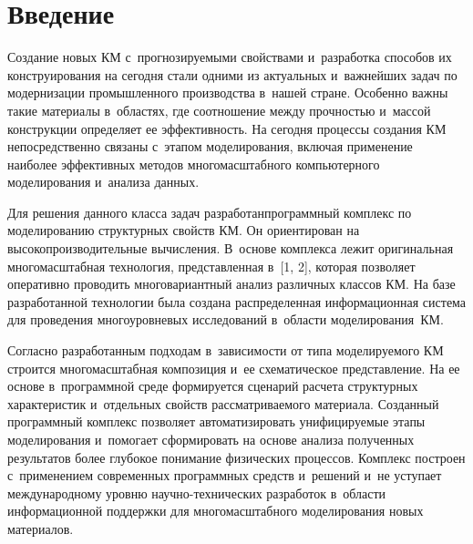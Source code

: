 
  



\thispagestyle{headings}

\begin{multicols}{2}

\label{st\stat}

\section{Введение}

\vspace*{-3pt}

     Создание новых КМ с~прогнозируемыми 
свойствами и~разработка способов их конструирования на сегодня стали одними 
из актуальных и~важнейших задач по модернизации промышленного 
производства в~нашей стране. Особенно важны такие материалы в~областях, где 
соотношение между проч\-ностью и~массой конструкции определяет ее 
эф\-фек\-тив\-ность. На сегодня процессы создания КМ
непосредственно связаны с~этапом моделирования, включая применение наиболее 
эффективных методов многомасштабного компьютерного моделирования и~анализа данных. 
     
     Для решения данного класса задач разработан\linebreak программный комплекс по 
моделированию структурных свойств КМ. Он 
ориентирован на высокопроизводительные вы\-чис\-ле\-ния. В~осно\-ве комплекса 
лежит оригинальная многомасштабная \mbox{технология}, пред\-став\-лен\-ная в~[1, 2], 
которая позволяет оперативно проводить многовариантный анализ различных 
классов КМ. На базе разработанной технологии была 
создана распределенная информационная сис\-те\-ма для проведения 
многоуровневых исследований в~об\-ласти моделирования~КМ. 

Согласно разработанным подходам в~за\-ви\-си\-мости от типа 
мо\-де\-ли\-ру\-емо\-го КМ строится многомасштабная 
композиция и~ее схематическое представление. На ее основе в~программной среде 
формируется сценарий расчета структурных характеристик и~отдельных свойств 
рас\-смат\-ри\-ва\-емо\-го материала. Созданный программный комплекс позволяет 
автоматизировать уни\-фи\-ци\-ру\-емые этапы моделирования и~помогает 
сформировать на основе анализа полученных результатов более глубокое 
понимание физических процессов. Комплекс построен с~применением 
современных программных средств и~решений и~не уступает международному 
уровню на\-уч\-но-тех\-ни\-че\-ских разработок в~об\-ласти информационной 
поддержки для многомасштабного моделирования новых материалов. 
     

\end{multicols}
